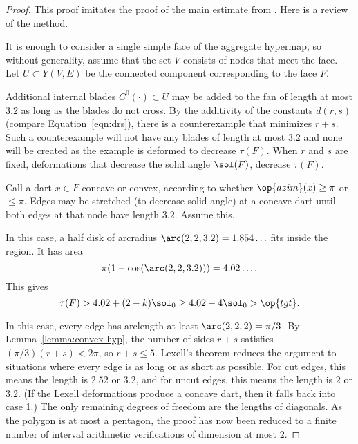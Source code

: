 \begin{proof} This proof imitates the proof of the main estimate from
  \cite{Hales:2006:DCG}.  Here is a review of the method.

  It is enough to consider a single simple face of the aggregate
  hypermap, so without generality, assume that the set $V$ consists of
  nodes that meet the face.  Let $U\subset Y(V,E)$ be the connected
  component corresponding to the face $F$.

  Additional internal blades $C^0(\cdot)\subset U$ may be added to the
  fan of length at most $3.2$ as long as the blades do not cross.  By
  the additivity of the constants $d(r,s)$ (compare
  Equation~\ref{eqn:drs}), there is a counterexample that minimizes
  $r+s$.  Such a counterexample will not have any blades of length at
  most $3.2$ and none will be created as the example is deformed to
  decrease $\tau(F)$.  When $r$ and $s$ are fixed, deformations that
  decrease the solid angle $\sol(F)$, decrease $\tau(F)$.

  Call a dart $x\in F$ concave or convex, according to whether
  $\op{azim}(x)\ge\pi$ or $\le\pi$.  Edges may be stretched (to
  decrease solid angle) at a concave dart until both edges at that
  node have length $3.2$. Assume this.  %

  In this case, a
  half disk of arcradius $\arc(2,2,3.2)=1.854\ldots$ fits inside the
  region.  It has area
\begin{displaymath}
\pi(1-\cos(\arc(2,2,3.2)))=4.02\ldots.
\end{displaymath}
This gives
\begin{displaymath}
\tau(F) > 4.02 + (2-k)\sol_0 \ge 4.02 -4 \sol_0 > \op{tgt}.
\end{displaymath}
%
%

  In this case, every edge has
arclength at least $\arc(2,2,2)=\pi/3$.  By
Lemma~\ref{lemma:convex-hyp}, the number of sides $r+s$ satisfies
$(\pi/3)(r+s) < 2\pi$, so $r+s\le5$.  Lexell's theorem reduces the
argument to situations where every edge is as long or as short as
possible.  For cut edges, this means the length is $2.52$ or $3.2$,
and for uncut edges, this means the length is $2$ or $3.2$.  (If the
Lexell deformations produce a concave dart, then it falls back into
case 1.)  The only remaining degrees of freedom are the lengths of
diagonals.  As the polygon is at most a pentagon, the proof has now
been reduced to a finite number of interval arithmetic verifications
of dimension at most $2$.  %


\end{proof}
